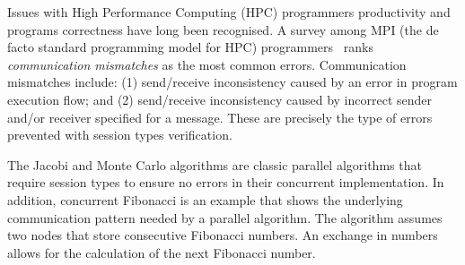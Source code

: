 


Issues with High Performance Computing (HPC)
programmers productivity and programs correctness
have long been recognised.
A survey among MPI (the de facto standard programming model for HPC)
programmers~\cite{MPIErrors} ranks
\textit{communication mismatches} as the most common errors.
Communication mismatches include:
(1) send/receive inconsistency caused by an error in
program execution flow; and
(2) send/receive inconsistency caused by incorrect
sender and/or receiver specified for a message.
These are precisely the type of errors prevented with
session types verification.

The Jacobi and Monte Carlo algorithms are classic parallel algorithms
that require session types to ensure no errors in their
concurrent implementation.
%
In addition, concurrent Fibonacci is an
example that shows the underlying communication
pattern needed by a parallel algorithm.
The algorithm assumes two nodes that store
consecutive Fibonacci numbers. An exchange
in numbers allows for the calculation of the
next Fibonacci number.





